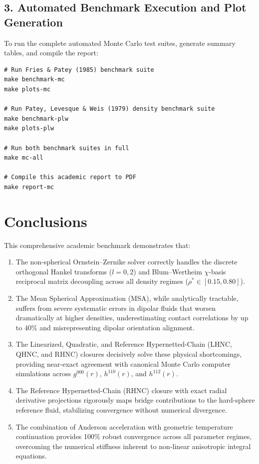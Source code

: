 \documentclass[11pt,a4paper]{article}
\begin{document}
\subsection{3. Automated Benchmark Execution and Plot Generation}

To run the complete automated Monte Carlo test suites, generate summary tables, and compile the report:
\begin{verbatim}
# Run Fries & Patey (1985) benchmark suite
make benchmark-mc
make plots-mc

# Run Patey, Levesque & Weis (1979) density benchmark suite
make benchmark-plw
make plots-plw

# Run both benchmark suites in full
make mc-all

# Compile this academic report to PDF
make report-mc
\end{verbatim}

\section{Conclusions}

This comprehensive academic benchmark demonstrates that:
\begin{enumerate}
    \item The non-spherical Ornstein--Zernike solver correctly handles the discrete orthogonal Hankel transforms ($l=0, 2$) and Blum--Wertheim $\chi$-basis reciprocal matrix decoupling across all density regimes ($\rho^* \in [0.15, 0.80]$).
    \item The Mean Spherical Approximation (MSA), while analytically tractable, suffers from severe systematic errors in dipolar fluids that worsen dramatically at higher densities, underestimating contact correlations by up to 40\% and misrepresenting dipolar orientation alignment.
    \item The Linearized, Quadratic, and Reference Hypernetted-Chain (LHNC, QHNC, and RHNC) closures decisively solve these physical shortcomings, providing near-exact agreement with canonical Monte Carlo computer simulations across $g^{000}(r)$, $h^{110}(r)$, and $h^{112}(r)$.
    \item The Reference Hypernetted-Chain (RHNC) closure with exact radial derivative projections rigorously maps bridge contributions to the hard-sphere reference fluid, stabilizing convergence without numerical divergence.
    \item The combination of Anderson acceleration with geometric temperature continuation provides 100\% robust convergence across all parameter regimes, overcoming the numerical stiffness inherent to non-linear anisotropic integral equations.
\end{enumerate}
\end{document}
